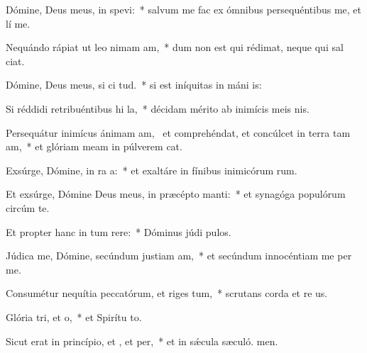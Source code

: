 \item Dómine, Deus meus, in  spevi:~* salvum me fac ex ómnibus persequéntibus me, et lí me.
\item Nequándo rápiat ut leo nimam am,~* dum non est qui rédimat, neque qui sal ciat.
\item Dómine, Deus meus, si ci tud.~* si est iníquitas in máni is:
\item Si réddidi retribuéntibus hi la,~* décidam mérito ab inimícis meis nis.
\item Persequátur inimícus ánimam am,~\pscross{} et comprehéndat, et concúlcet in terra tam am,~* et glóriam meam in púlverem cat.
\item Exsúrge, Dómine, in ra a:~* et exaltáre in fínibus inimicórum rum.
\item Et exsúrge, Dómine Deus meus, in præcépto  manti:~* et synagóga populórum circúm te.
\item Et propter hanc in tum rere:~* Dóminus júdi pulos.
\item Júdica me, Dómine, secúndum justiam am,~* et secúndum innocéntiam me per me.
\item Consumétur nequítia peccatórum, et riges tum,~* scrutans corda et re us.
\item Glória tri, et o,~* et Spirítu to.
\item Sicut erat in princípio, et , et per,~* et in sǽcula sæculó. men.
